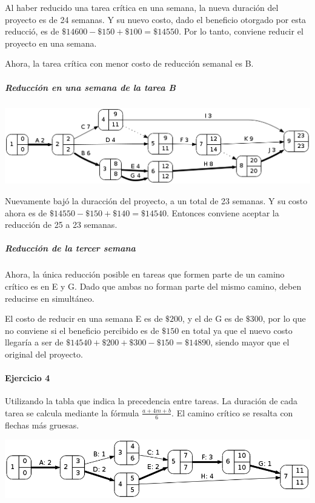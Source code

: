 \documentclass[a4paper,10pt]{article}
\begin{document}
  Al haber reducido una tarea crítica en una semana, la nueva duración del proyecto es de 24 semanas. Y su nuevo costo, dado el beneficio otorgado por esta reducció, es de $\$14600 - \$150 + \$100 = \$14550$. Por lo tanto, conviene reducir el proyecto en una semana.


  Ahora, la tarea crítica con menor costo de reducción semanal es B.

  \subparagraph {Reducción en una semana de la tarea B}
  \begin{center}
    \includegraphics[scale=0.4,keepaspectratio=true]{img/ej3-2.png} 
  \end{center}

  Nuevamente bajó la duracción del proyecto, a un total de 23 semanas. Y su costo ahora es de $\$14550 - \$150 + \$140 = \$14540$. Entonces conviene aceptar la reducción de 25 a 23 semanas.

  \subparagraph {Reducción de la tercer semana}
  Ahora, la única reducción posible en tareas que formen parte de un camino crítico es en E y G. Dado que ambas no forman parte del mismo camino, deben reducirse en simultáneo.

  El costo de reducir en una semana E es de $\$200$, y el de G es de $\$300$, por lo que no conviene si el beneficio percibido es de $\$150$ en total ya que el nuevo costo llegaría a ser de $\$14540 + \$200 + \$300 - \$150 = \$14890$, siendo mayor que el original del proyecto.

  
  
\paragraph{Ejercicio 4} Utilizando la tabla que indica la precedencia entre tareas. La duración de cada tarea se calcula mediante la fórmula $\frac{a + 4m + b}{6}$. El camino crítico se resalta con flechas más gruesas.
   \begin{center}
    \includegraphics[scale=0.5,keepaspectratio=true]{img/ej4-1.png} 
  \end{center}
  
\end{document}
